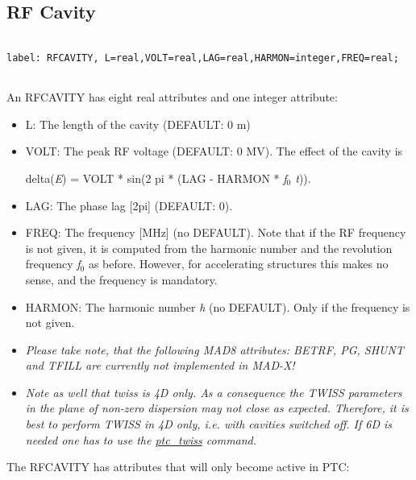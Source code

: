 




\subsection{RF Cavity}
\begin{verbatim}

label: RFCAVITY, L=real,VOLT=real,LAG=real,HARMON=integer,FREQ=real;
                  
\end{verbatim} An RFCAVITY has eight real attributes and one integer attribute: 
\begin{itemize}
	\item L: The length of the cavity (DEFAULT: 0 m) 
	\item VOLT: The peak RF voltage (DEFAULT: 0 MV). The effect of the cavity is 

 delta(\textit{E}) = VOLT * sin(2 pi * (LAG - HARMON * \textit{f$_0$ t})). 


	\item LAG: The phase lag [2pi] (DEFAULT: 0). 
	\item FREQ: The frequency [MHz] (no DEFAULT). Note that if the RF frequency is not given, it is computed from the harmonic number and the revolution frequency \textit{f$_0$} as before. However, for accelerating structures this makes no sense,  and the frequency is mandatory. 
	\item HARMON: The harmonic number \textit{h} (no DEFAULT). Only if the frequency is not given. 

	\item \textit{ Please take note, that the following MAD8 attributes: BETRF, PG, SHUNT and TFILL are currently not implemented in MAD-X!}
	\item \textit{ Note as well that twiss is 4D only. As a consequence the TWISS parameters in the plane of non-zero dispersion may not close as expected. Therefore, it is best to perform TWISS in 4D only, i.e. with cavities switched off. If 6D is needed one has to use the \href{../ptc_twiss/ptc_twiss.html}{ptc\_twiss} command. }
\end{itemize}  The RFCAVITY has attributes that will only become active in PTC: 
